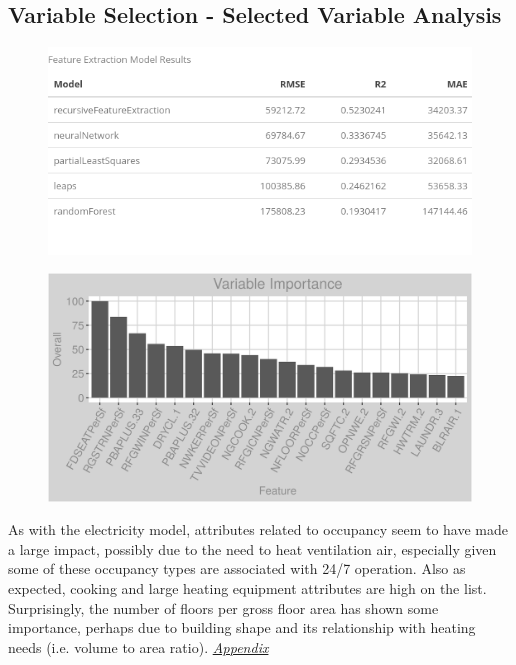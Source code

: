 \subsection{Variable Selection - Selected Variable Analysis}
\begin{figure}[h]
\centering
\includegraphics[width=.6\textwidth, height=0.25\textheight]{Images/natural_gas_psf_fe_summary.png}
\end{figure}
\begin{figure}[h]
\centering
\includegraphics[width=.99\textwidth, height=0.375\textheight]{Images/natural_gas_psf_all_vars.png}
\end{figure}
\FloatBarrier

As with the electricity model, attributes related to occupancy seem to have made a large impact, possibly due to the need to heat ventilation air, especially given some of these occupancy types are associated with 24/7 operation.  Also as expected, cooking and large heating equipment attributes are high on the list.  Surprisingly, the number of floors per gross floor area has shown some importance, perhaps due to building shape and its relationship with heating needs (i.e. volume to area ratio). \textit{\hyperref[appendix:natural_gas:sva]{Appendix}}